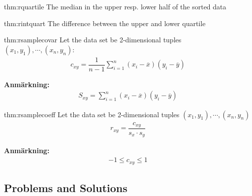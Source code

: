 \par\bigskip
\begin{theo}{thm:rquartile}
  The median in the upper resp. lower half of the sorted data 
\end{theo}
\par\bigskip
\begin{theo}{thm:rintquart}
  The difference between the upper and lower quartile 
\end{theo}
\newpage
\begin{theo}{thm:rsamplecovar}
  Let the data set be 2-dimensional tuples $(x_1,y_1),\cdots,(x_n,y_n)$:
  \begin{equation*}
    \begin{gathered}
      c_{xy} = \dfrac{1}{n-1}\sum_{i=1}^{n}(x_i-\overline{x})(y_i-\overline{y})
    \end{gathered}
  \end{equation*}
\end{theo}
\par\bigskip
\noindent\textbf{Anmärkning:}
\begin{equation*}
  \begin{gathered}
    S_{xy} = \sum_{i=1}^{n}(x_i-\overline{x})(y_i-\overline{y})
  \end{gathered}
\end{equation*}
\begin{theo}{thm:rsamplecoeff}
  Let the data set be 2-dimensional tuples $(x_1,y_1),\cdots,(x_n,y_n)$ 
  \begin{equation*}
    \begin{gathered}
      r_{xy} = \dfrac{c_{xy}}{s_x\cdot s_y}
    \end{gathered}
  \end{equation*}
\end{theo}
\par\bigskip
\noindent\textbf{Anmärkning:}
\begin{equation*}
  \begin{gathered}
    -1\leq c_{xy}\leq 1
  \end{gathered}
\end{equation*}
\par\bigskip
\subsection{Problems and Solutions}\hfill\\
